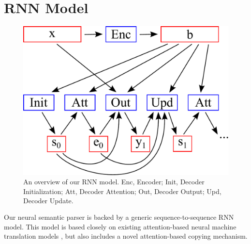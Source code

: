 \documentclass[11pt,letterpaper]{article}
\newcommand\pl[1]{}
\newcommand\rj[1]{}
\begin{document}

\section{RNN Model}
\begin{figure}[t] 
\small
\begin{center} 
  \includegraphics[scale=0.4]{fig-rnn.pdf}
\end{center} 
\caption{An overview of our RNN model.  
  Enc, Encoder; Init, Decoder Initialization;
  Att, Decoder Attention; Out, Decoder Output;
  Upd, Decoder Update.
}
\label{fig:rnn}
\end{figure}
Our neural semantic parser is backed by a generic sequence-to-sequence RNN model.
This model is based closely on existing 
attention-based neural machine translation models
\cite{luong2015translation},
but also includes a novel attention-based copying mechanism.

\pl{we should have a paragraph after our description
  or in discussion comparing our model with neural MT models;
  doing a careful diff is important }
  \rj{It's basically the same as Thang's other than the output module}
\end{document}
